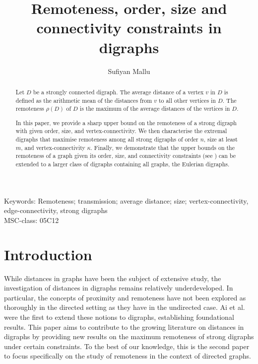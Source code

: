 \documentclass[a4paper,11pt]{article}
\begin{document}
\title{Remoteness, order, size and connectivity constraints in digraphs}


\author[]{Sufiyan Mallu}

\maketitle

\begin{abstract}

Let \( D \) be a strongly connected digraph. The average distance of a vertex \( v \) in \( D \) is defined as the arithmetic mean of the distances from \( v \) to all other vertices in \( D \). The remoteness \( \rho(D) \) of \( D \) is the maximum of the average distances of the vertices in \( D \). 

In this paper, we provide a sharp upper bound on the remoteness of a strong digraph with given order, size, and vertex-connectivity. We then characterise the extremal digraphs that maximise remoteness among all strong digraphs of order \(n\), size at least \(m\), and vertex-connectivity \(\kappa\). Finally, we demonstrate that the upper bounds on the remoteness of a graph given its order, size, and connectivity constraints (see \cite{DanMafMal2025}) can be extended to a larger class of digraphs containing all graphs, the Eulerian digraphs.




\end{abstract}

Keywords: Remoteness; transmission; average distance; size; vertex-connectivity, edge-connectivity, strong digraphs \\[5mm]
MSC-class: 05C12 



\section{Introduction}

While distances in graphs have been the subject of extensive study, the investigation of distances in digraphs remains relatively underdeveloped. In particular, the concepts of proximity and remoteness have not been explored as thoroughly in the directed setting as they have in the undirected case. Ai et al. \cite{AiGerGutMaf2021} were the first to extend these notions to digraphs, establishing foundational results. This paper aims to contribute to the growing literature on distances in digraphs by providing new results on the maximum remoteness of strong digraphs under certain constraints. To the best of our knowledge, this is the second paper to focus specifically on the study of remoteness in the context of directed graphs.\\
\end{document}
